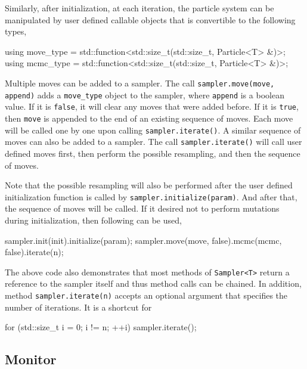 Similarly, after initialization, at each iteration, the particle system can be
manipulated by user defined callable objects that is convertible to the
following types,
\begin{cppcode}
  using move_type = std::function<std::size_t(std::size_t, Particle<T> &)>;
  using mcmc_type = std::function<std::size_t(std::size_t, Particle<T> &)>;
\end{cppcode}
Multiple moves can be added to a sampler. The call
\verb|sampler.move(move, append)| adds a \verb|move_type| object to the
sampler, where \verb|append| is a boolean value. If it is \verb|false|, it will
clear any moves that were added before. If it is \verb|true|, then \verb|move|
is appended to the end of an existing sequence of moves. Each move will be
called one by one upon calling \verb|sampler.iterate()|. A similar sequence of
\mcmc moves can also be added to a sampler. The call \verb|sampler.iterate()|
will call user defined moves first, then perform the possible resampling, and
then the sequence of \mcmc moves.

Note that the possible resampling will also be performed after the user defined
initialization function is called by \verb|sampler.initialize(param)|. And
after that, the sequence of \mcmc moves will be called. If it desired not to
perform mutations during initialization, then following can be used,
\begin{cppcode}
  sampler.init(init).initialize(param);
  sampler.move(move, false).mcmc(mcmc, false).iterate(n);
\end{cppcode}
The above code also demonstrates that most methods of \verb|Sampler<T>| return
a reference to the sampler itself and thus method calls can be chained. In
addition, method \verb|sampler.iterate(n)| accepts an optional argument that
specifies the number of iterations. It is a shortcut for
\begin{cppcode}
  for (std::size_t i = 0; i != n; ++i)
      sampler.iterate();
\end{cppcode}

\subsection{Monitor}
\label{sub:Monitor}

